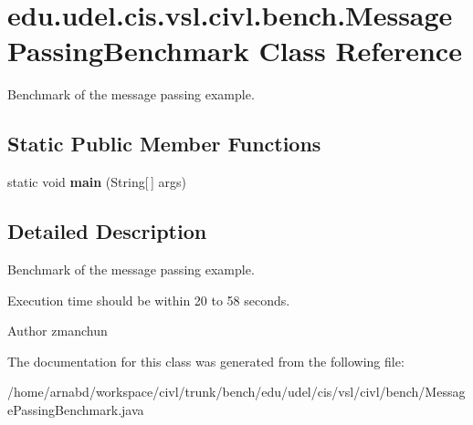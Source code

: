 \hypertarget{classedu_1_1udel_1_1cis_1_1vsl_1_1civl_1_1bench_1_1MessagePassingBenchmark}{}\section{edu.\+udel.\+cis.\+vsl.\+civl.\+bench.\+Message\+Passing\+Benchmark Class Reference}
\label{classedu_1_1udel_1_1cis_1_1vsl_1_1civl_1_1bench_1_1MessagePassingBenchmark}


Benchmark of the message passing example.  


\subsection*{Static Public Member Functions}
\begin{DoxyCompactItemize}
\item 
\hypertarget{classedu_1_1udel_1_1cis_1_1vsl_1_1civl_1_1bench_1_1MessagePassingBenchmark_a713f60d50974b6300033ec460272a745}{}static void {\bfseries main} (String\mbox{[}$\,$\mbox{]} args)\label{classedu_1_1udel_1_1cis_1_1vsl_1_1civl_1_1bench_1_1MessagePassingBenchmark_a713f60d50974b6300033ec460272a745}

\end{DoxyCompactItemize}


\subsection{Detailed Description}
Benchmark of the message passing example. 

Execution time should be within 20 to 58 seconds.

\begin{DoxyAuthor}{Author}
zmanchun 
\end{DoxyAuthor}


The documentation for this class was generated from the following file\+:\begin{DoxyCompactItemize}
\item 
/home/arnabd/workspace/civl/trunk/bench/edu/udel/cis/vsl/civl/bench/Message\+Passing\+Benchmark.\+java\end{DoxyCompactItemize}
